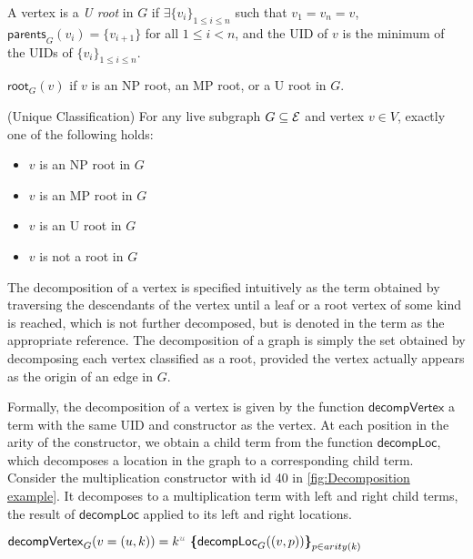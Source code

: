 \begin{definition}
    A vertex is a \textit{U root} in $G$ if $\exists \{v_i\}_{1 \leq i \leq n}$ such that $v_1 = v_n = v$, $\mathsf{parents}_{G}(v_i)=\{v_{i+1}\}$ for all $1 \leq i < n$, and the UID of $v$ is the minimum of the UIDs of $\{v_i\}_{1 \leq i \leq n}$.
\end{definition}

\begin{definition}
    $\mathsf{root}_G(v)$ if $v$ is an NP root, an MP root, or a U root in $G$.
\end{definition}

\begin{lemma}
\label{lem:uniq-classification}
    (Unique Classification) For any live subgraph $G\subseteq \mathcal{E}$ and vertex $v\in V$, exactly one of the following holds: 
    \begin{itemize}
        \item $v$ is an NP root in $G$
        \item $v$ is an MP root in $G$
        \item $v$ is an U root in $G$
        \item $v$ is not a root in $G$
    \end{itemize}
\end{lemma}

The decomposition of a vertex is specified intuitively as the term obtained by traversing the descendants of the vertex until a leaf or a root vertex of some kind is reached, which is not further decomposed, but is denoted in the term as the appropriate reference. The decomposition of a graph is simply the set obtained by decomposing each vertex classified as a root, provided the vertex actually appears as the origin of an edge in $G$.

Formally, the decomposition of a vertex is given by the function $\mathsf{decompVertex}$ a term with the same UID and constructor as the vertex. At each position in the arity of the constructor, we obtain a child term from the function $\mathsf{decompLoc}$, which decomposes a location in the graph to a corresponding child term. Consider the multiplication constructor with id 40 in \autoref{fig:Decomposition example}. It decomposes to a multiplication term with left and right child terms, the result of $\mathsf{decompLoc}$ applied to its left and right locations. 

\begin{definition}
    $\mathsf{decompVertex}_{G}(v = (u,k)) = \genericTerm{u}{\mathsf{decompLoc}_{G}((v,p))}$
\end{definition}

